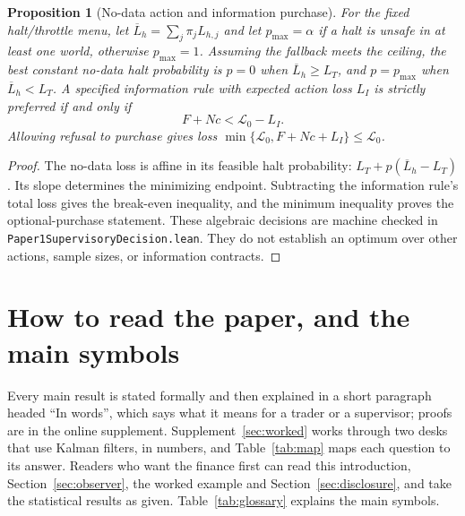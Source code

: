 \documentclass[12pt]{article}
\newtheorem{proposition}[theorem]{Proposition}
\theoremstyle{definition}
\theoremstyle{remark}
\begin{document}
\begin{proposition}[No-data action and information purchase]\label{prop:priced_decision}
For the fixed halt/throttle menu, let $\overline L_h=\sum_j\pi_jL_{h,j}$ and let $p_{\max}=\alpha$ if a halt is unsafe in at least one world, otherwise $p_{\max}=1$. Assuming the fallback meets the ceiling, the best constant no-data halt probability is $p=0$ when $\overline L_h\ge L_T$, and $p=p_{\max}$ when $\overline L_h<L_T$. A specified information rule with expected action loss $L_I$ is strictly preferred if and only if
\[
 F+Nc<\mathcal L_0-L_I.
\]
Allowing refusal to purchase gives loss $\min\{\mathcal L_0,F+Nc+L_I\}\le\mathcal L_0$.
\end{proposition}
\begin{proof}
The no-data loss is affine in its feasible halt probability: $L_T+p(\overline L_h-L_T)$. Its slope determines the minimizing endpoint. Subtracting the information rule's total loss gives the break-even inequality, and the minimum inequality proves the optional-purchase statement. These algebraic decisions are machine checked in \nolinkurl{Paper1SupervisoryDecision.lean}. They do not establish an optimum over other actions, sample sizes, or information contracts.
\end{proof}

\section{How to read the paper, and the main symbols}\label{app:howtoread} Every main result is stated formally and then explained in a short paragraph headed ``In words'', which says what it means for a trader or a supervisor; proofs are in the online supplement. Supplement~\ref{sec:worked} works through two desks that use Kalman filters, in numbers, and Table~\ref{tab:map} maps each question to its answer. Readers who want the finance first can read this introduction, Section~\ref{sec:observer}, the worked example and Section~\ref{sec:disclosure}, and take the statistical results as given. Table~\ref{tab:glossary} explains the main symbols.
\end{document}

